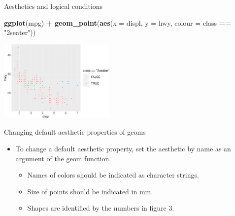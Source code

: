 \documentclass[ignorenonframetext,]{beamer}
\newenvironment{Shaded}{\begin{snugshade}}{\end{snugshade}}
\newcommand{\DataTypeTok}[1]{\textcolor[rgb]{0.13,0.29,0.53}{#1}}
\newcommand{\KeywordTok}[1]{\textcolor[rgb]{0.13,0.29,0.53}{\textbf{#1}}}
\newcommand{\NormalTok}[1]{#1}
\newcommand{\OperatorTok}[1]{\textcolor[rgb]{0.81,0.36,0.00}{\textbf{#1}}}
\newcommand{\StringTok}[1]{\textcolor[rgb]{0.31,0.60,0.02}{#1}}
\begin{document}
\begin{frame}[fragile]{Aesthetics and logical conditions}
\protect\hypertarget{aesthetics-and-logical-conditions-2}{}

\begin{Shaded}
\begin{Highlighting}[]
\KeywordTok{ggplot}\NormalTok{(mpg) }\OperatorTok{+}\StringTok{ }
\StringTok{  }\KeywordTok{geom_point}\NormalTok{(}\KeywordTok{aes}\NormalTok{(}\DataTypeTok{x =}\NormalTok{ displ, }\DataTypeTok{y =}\NormalTok{ hwy, }
                 \DataTypeTok{colour =}\NormalTok{ class }\OperatorTok{==}\StringTok{ "2seater"}\NormalTok{))}
\end{Highlighting}
\end{Shaded}

\begin{center}\includegraphics[height=150px]{data-visualization_files/figure-beamer/unnamed-chunk-37-1} \end{center}

\end{frame}

\begin{frame}{Changing default aesthetic properties of geoms}
\protect\hypertarget{changing-default-aesthetic-properties-of-geoms}{}

\begin{itemize}
\item
  To change a default aesthetic property, set the aesthetic by name as
  an argument of the geom function.

  \begin{itemize}
  \item
    Names of colors should be indicated as character strings.
  \item
    Size of points should be indicated in mm.
  \item
    Shapes are identified by the numbers in figure 3.
  \end{itemize}
\end{itemize}

\end{frame}
\end{document}
